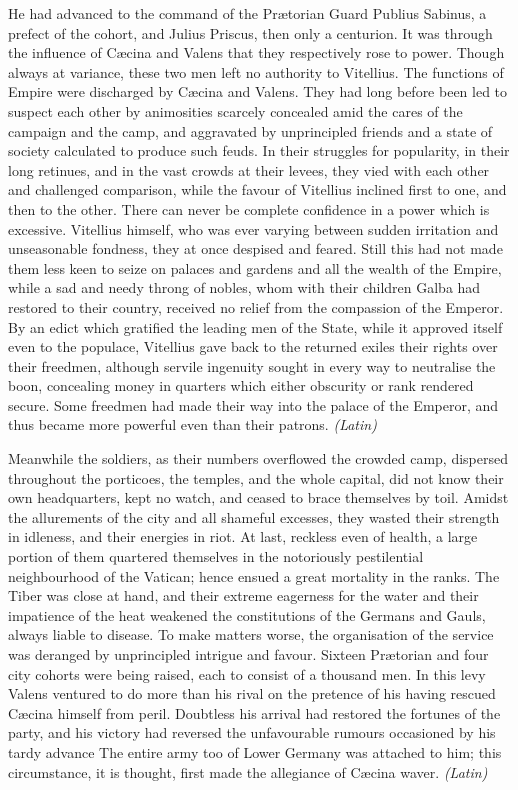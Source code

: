 He had advanced to the command of the Prætorian Guard Publius Sabinus, a prefect of the cohort, and Julius Priscus, then only a centurion. It was through the influence of Cæcina and Valens that they respectively rose to power. Though always at variance, these two men left no authority to Vitellius. The functions of Empire were discharged by Cæcina and Valens. They had long before been led to suspect each other by animosities scarcely concealed amid the cares of the campaign and the camp, and aggravated by unprincipled friends and a state of society calculated to produce such feuds. In their struggles for popularity, in their long retinues, and in the vast crowds at their levees, they vied with each other and challenged comparison, while the favour of Vitellius inclined first to one, and then to the other. There can never be complete confidence in a power which is excessive. Vitellius himself, who was ever varying between sudden irritation and unseasonable fondness, they at once despised and feared. Still this had not made them less keen to seize on palaces and gardens and all the wealth of the Empire, while a sad and needy throng of nobles, whom with their children Galba had restored to their country, received no relief from the compassion of the Emperor. By an edict which gratified the leading men of the State, while it approved itself even to the populace, Vitellius gave back to the returned exiles their rights over their freedmen, although servile ingenuity sought in every way to neutralise the boon, concealing money in quarters which either obscurity or rank rendered secure. Some freedmen had made their way into the palace of the Emperor, and thus became more powerful even than their patrons. \emph{(Latin)}


Meanwhile the soldiers, as their numbers overflowed the crowded camp, dispersed throughout the porticoes, the temples, and the whole capital, did not know their own headquarters, kept no watch, and ceased to brace themselves by toil. Amidst the allurements of the city and all shameful excesses, they wasted their strength in idleness, and their energies in riot. At last, reckless even of health, a large portion of them quartered themselves in the notoriously pestilential neighbourhood of the Vatican; hence ensued a great mortality in the ranks. The Tiber was close at hand, and their extreme eagerness for the water and their impatience of the heat weakened the constitutions of the Germans and Gauls, always liable to disease. To make matters worse, the organisation of the service was deranged by unprincipled intrigue and favour. Sixteen Prætorian and four city cohorts were being raised, each to consist of a thousand men. In this levy Valens ventured to do more than his rival on the pretence of his having rescued Cæcina himself from peril. Doubtless his arrival had restored the fortunes of the party, and his victory had reversed the unfavourable rumours occasioned by his tardy advance The entire army too of Lower Germany was attached to him; this circumstance, it is thought, first made the allegiance of Cæcina waver. \emph{(Latin)}

